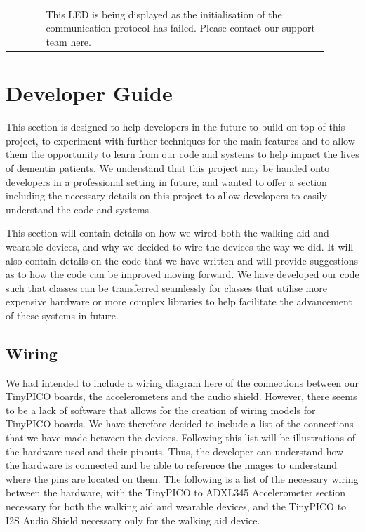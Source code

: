 \begin{tabular}{ m{0.1\linewidth} m{0.8\linewidth} }
				& This LED is being displayed as the initialisation of the communication protocol has failed. Please contact our support team here. \\
				 
			\end{tabular}

	\newpage
	\section{Developer Guide}
	\label{sec:developer_guide}

		This section is designed to help developers in the future to build on top of this project, to experiment with further techniques for the main features and to allow them the opportunity to learn from our code and systems to help impact the lives of dementia patients. We understand that this project may be handed onto developers in a professional setting in future, and wanted to offer a section including the necessary details on this project to allow developers to easily understand the code and systems.

		This section will contain details on how we wired both the walking aid and wearable devices, and why we decided to wire the devices the way we did. It will also contain details on the code that we have written and will provide suggestions as to how the code can be improved moving forward. We have developed our code such that classes can be transferred seamlessly for classes that utilise more expensive hardware or more complex libraries to help facilitate the advancement of these systems in future. 

		\subsection{Wiring}
		\label{subsec:wiring}

			We had intended to include a wiring diagram here of the connections between our TinyPICO boards, the accelerometers and the audio shield. However, there seems to be a lack of software that allows for the creation of wiring models for TinyPICO boards. We have therefore decided to include a list of the connections that we have made between the devices. Following this list will be illustrations of the hardware used and their pinouts. Thus, the developer can understand how the hardware is connected and be able to reference the images to understand where the pins are located on them. The following is a list of the necessary wiring between the hardware, with the TinyPICO to ADXL345 Accelerometer section necessary for both the walking aid and wearable devices, and the TinyPICO to I2S Audio Shield necessary only for the walking aid device.


